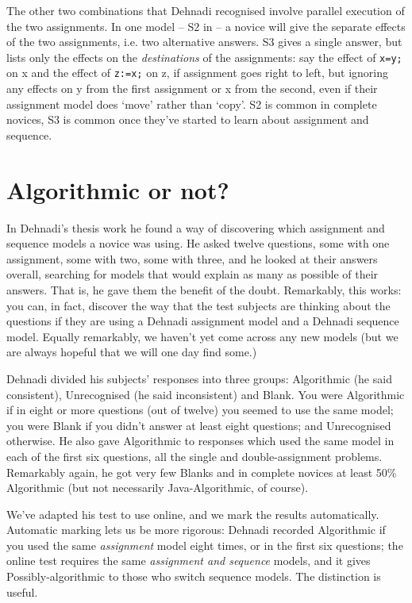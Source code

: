 \documentclass[11pt,a4paper]{article}
\begin{document}
The other two combinations that Dehnadi recognised involve parallel execution of the two assignments. In one model -- S2 in  -- a novice will give the separate effects of the two assignments, i.e. two alternative answers. S3 gives a single answer, but lists only the effects on the \emph{destinations} of the assignments: say the effect of \lstinline{x=y;} on x and the effect of \lstinline{z:=x;} on z, if assignment goes right to left, but ignoring any effects on y from the first assignment or x from the second, even if their assignment model does `move' rather than `copy'. S2 is common in complete novices, S3 is common once they've started to learn about assignment and sequence.

\section{Algorithmic or not?}

In Dehnadi's thesis work he found a way of discovering which assignment and sequence models a novice was using. He asked twelve questions, some with one assignment, some with two, some with three, and he looked at their answers overall, searching for models that would explain as many as possible of their answers. That is, he gave them the benefit of the doubt. Remarkably, this works: you can, in fact, discover the way that the test subjects are thinking about the questions if they are using a Dehnadi assignment model and a Dehnadi sequence model. Equally remarkably, we haven't yet come across any new models (but we are always hopeful that we will one day find some.)

Dehnadi divided his subjects' responses into three groups: Algorithmic (he said consistent), Unrecognised (he said inconsistent) and Blank. You were Algorithmic if in  eight or more questions (out of twelve) you seemed to use the same model; you were Blank if you didn't answer at least eight questions; and Unrecognised otherwise. He also gave Algorithmic to responses which used the same model in each of the first six questions, all the single and double-assignment problems. Remarkably again, he got very few Blanks and in complete novices at least 50\% Algorithmic (but not necessarily Java-Algorithmic, of course). 

We've adapted his test to use online, and we mark the results automatically. Automatic marking lets us be more rigorous: Dehnadi recorded Algorithmic if you used the same \emph{assignment} model eight times, or in the first six questions; the online test requires the same \emph{assignment and sequence} models, and it gives Possibly-algorithmic to those who switch sequence models. The distinction is useful. 
\end{document}
